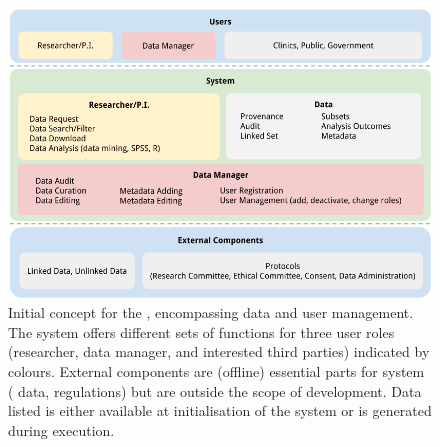 \begin{figure}[h]
	\centering
	\includegraphics[width=1.0\linewidth]{images/brainstorm-before}
	\caption{
		Initial concept for the \ivfsystem{}, encompassing data and user management. 
		The system offers different sets of functions for three user roles (researcher, data manager, and interested third parties) indicated by colours. 
		External components are (offline) essential parts for system (\eg{} data, regulations) but are outside the scope of development.
		Data listed is either available at initialisation of the system or is generated during execution.
	}
	\label{fig:brainstorm-before}
\end{figure}